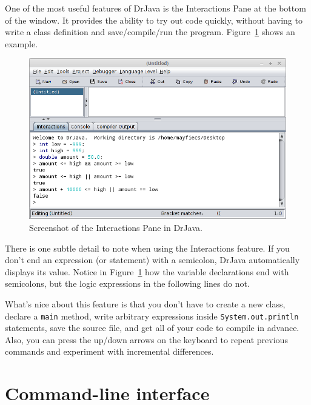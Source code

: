 \documentclass[12pt]{book}
\theoremstyle{exercise}
\newcommand{\java}[1]{\verb"#1"}
\begin{document}
One of the most useful features of DrJava is the Interactions Pane at the bottom of the window.
It provides the ability to try out code quickly, without having to write a class definition and save/compile/run the program.
Figure~\ref{fig.drjava2} shows an example.

\begin{figure}[!ht]
\begin{center}
\includegraphics[width=\textwidth]{figs/drjava-logic.png}
\caption{Screenshot of the Interactions Pane in DrJava.}
\label{fig.drjava2}
\end{center}
\end{figure}

There is one subtle detail to note when using the Interactions feature.
If you don't end an expression (or statement) with a semicolon, DrJava automatically displays its value.
Notice in Figure~\ref{fig.drjava2} how the variable declarations end with semicolons, but the logic expressions in the following lines do not.

What's nice about this feature is that you don't have to create a new class, declare a \java{main} method, write arbitrary expressions inside \java{System.out.println} statements, save the source file, and get all of your code to compile in advance.
Also, you can press the up/down arrows on the keyboard to repeat previous commands and experiment with incremental differences.


\section{Command-line interface}
\label{commandline}

\end{document}
